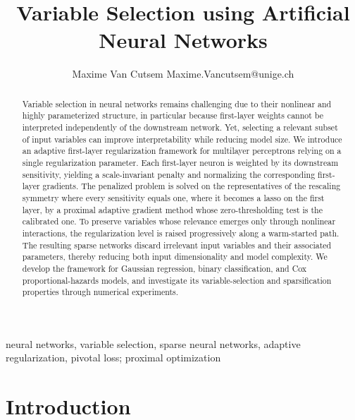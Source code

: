 \documentclass[twoside,11pt]{article}
\title{Variable Selection using Artificial Neural Networks}
\author{\name Maxime Van Cutsem \email Maxime.Vancutsem@unige.ch
}
\begin{document}

\maketitle

\begin{abstract}%
Variable selection in neural networks remains challenging due to their
nonlinear and highly parameterized structure, in particular because
first-layer weights cannot be interpreted independently of the downstream
network. Yet, selecting a relevant subset of input variables can improve
interpretability while reducing model size. We introduce an adaptive
first-layer regularization framework for multilayer perceptrons relying on a single regularization parameter. Each first-layer neuron is weighted by its downstream sensitivity, yielding a scale-invariant penalty and normalizing the corresponding first-layer gradients. The penalized problem is solved on the representatives of the rescaling symmetry where every sensitivity equals one, where it becomes a lasso on the first layer, by a proximal adaptive gradient method whose zero-thresholding test is the calibrated one. To preserve variables whose relevance emerges only through nonlinear interactions, the regularization level is raised progressively along a warm-started path. The resulting sparse networks discard irrelevant input variables and their associated parameters, thereby reducing both input dimensionality and model complexity. We develop the framework for Gaussian regression, binary classification, and Cox proportional-hazards models, and investigate its variable-selection and
sparsification properties through numerical experiments.
\end{abstract}

\begin{keywords}
  neural networks, variable selection, sparse neural networks, 
adaptive regularization, pivotal loss; proximal optimization
\end{keywords}

\section{Introduction}\label{sec:intro}
\end{document}
